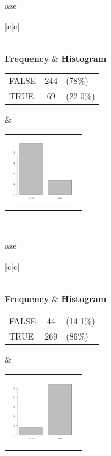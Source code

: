  aze 
  \begin{center}
    \addtolength{\leftskip}{-4cm}\addtolength{\rightskip}{-4cm}
    \begin{tabular}{|c|c|}

      \hline
        \\
      \hline
        {\bf Frequency} & {\bf Histogram}  \\
          \begin{tabular}{@{}l@{ : }cl@{}}
            FALSE & 244 &(78\%) \\
            TRUE & 69 &(22.0\%) \\
          \end{tabular}
      &
          \begin{tabular}{@{}l@{}}
            \includegraphics[width=3cm]{graphUniv/V18-barplot}
          \end{tabular}
      \\ \hline 

    \end{tabular}
  \end{center}
  
  



 aze 
  \begin{center}
    \addtolength{\leftskip}{-4cm}\addtolength{\rightskip}{-4cm}
    \begin{tabular}{|c|c|}

      \hline
        \\
      \hline
        {\bf Frequency} & {\bf Histogram}  \\
          \begin{tabular}{@{}l@{ : }cl@{}}
            FALSE & 44 &(14.1\%) \\
            TRUE & 269 &(86\%) \\
          \end{tabular}
      &
          \begin{tabular}{@{}l@{}}
            \includegraphics[width=3cm]{graphUniv/V19-barplot}
          \end{tabular}
      \\ \hline 

    \end{tabular}
  \end{center}
  
